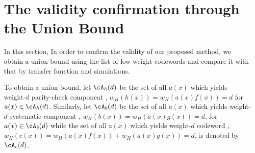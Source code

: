 \section{The validity confirmation through the Union Bound}
\label{sec4}


 In this section, In order to confirm the validity of our proposed method, we obtain a union bound using the list of low-weight codewords and compare it with that by transfer function and simulations.

To obtain a union bound, let $\cA_h(d)$ be the set of all $a(x)$ which yields weight-$d$ parity-check component \ie, $w_H(h(x))=w_H(a(x)f(x))=d$ for $a(x) \in \cA_h(d)$. 
Similarly, let $\cA_b(d)$ be the set of all $a(x)$ which yields weight-$d$ systematic component \ie, $w_H(b(x))=w_H(a(x)g(x))=d$, for $a(x) \in \cA_b(d)$
while the set of all $a(x)$ which yields weight-$d$ codeword \ie, $w_H(c(x))=w_H(a(x)f(x))+ w_H(a(x)g(x))=d$, is denoted by $\cA_c(d)$.

